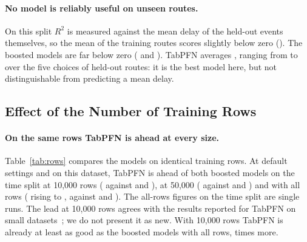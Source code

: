 \documentclass[runningheads]{llncs}
\begin{document}
\paragraph{No model is reliably useful on unseen routes.}
On this split $R^2$ is measured against the mean delay of the held-out
events themselves, so the mean of the training routes scores slightly below
zero (). The boosted models are far below zero
( and ). TabPFN averages
, ranging from  to
 over the five choices of held-out routes: it is the
best model here, but not distinguishable from predicting a mean delay.

\subsection{Effect of the Number of Training Rows}

\begin{table}[t]
\caption{$R^2$ by number of training rows; in each row the three models use
the same training rows and the same \FixedTestCap{} test events. Mean $\pm$
standard deviation over random samples or seeds; a single value is a single
run.}
\label{tab:rows}
\centering
\small

\end{table}

\paragraph{On the same rows TabPFN is ahead at every size.}
Table~\ref{tab:rows} compares the models on identical training rows. At
default settings and on this dataset, TabPFN is ahead of both boosted models
on the time split at 10{,}000 rows ( against
 and ), at 50{,}000
( against  and
) and with all rows (
rising to , against  and
). The all-rows figures on the time split are
single runs. The lead at 10{,}000 rows agrees with the results reported for
TabPFN on small datasets~\cite{hollmann2025tabpfn}; we do not present it as
new. With 10{,}000 rows TabPFN is already at least as good as the boosted
models with all rows, \TimeRowRatio{} times more.
\end{document}

